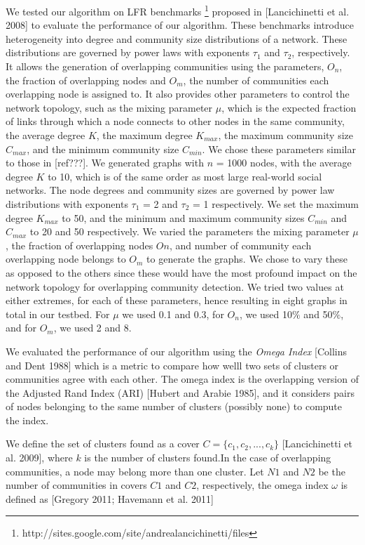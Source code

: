 We tested our algorithm on LFR benchmarks \footnote{http://sites.google.com/site/andrealancichinetti/files} proposed in [Lancichinetti et al. 2008] to evaluate the performance of our algorithm. These benchmarks introduce heterogeneity into degree and community size distributions of a network. These distributions are governed by power laws with exponents $\tau_1$ and $\tau_2$, respectively. It allows the generation of overlapping communities using the parameters, $O_n$, the fraction of overlapping nodes and $O_m$, the number of communities each overlapping node is assigned to. It also provides other parameters to control the network topology, such as the mixing parameter $\mu$, which is the expected fraction of links through which a node connects to other nodes in the same community, the average degree $K$, the maximum degree $K_{max}$, the maximum community size $C_{max}$, and the minimum community size $C_{min}$. We chose these parameters similar to those in [ref???]. We generated graphs with $n$ = 1000 nodes, with the average degree $K$ to 10, which is of the same order as most large real-world social networks. The node degrees and community sizes are governed by power law distributions with exponents $\tau_1$ = 2 and $\tau_2$ = 1 respectively. We set the maximum degree $K_{max}$ to 50, and the minimum and maximum community sizes $C_{min}$ and $C_{max}$ to 20 and 50 respectively. We varied the parameters the mixing parameter $\mu$, the fraction of overlapping nodes $On$, and number of community each overlapping node belongs to $O_m$ to generate the graphs. We chose to vary these as opposed to the others since these would have the most profound impact on the network topology for overlapping community detection. We tried two values at either extremes, for each of these parameters, hence resulting in eight graphs in total in our testbed. For $\mu$ we used 0.1 and 0.3, for $O_n$, we used 10$\%$ and 50$\%$, and for $O_m$, we used 2 and 8.

We evaluated the performance of our algorithm using the {\it Omega Index} [Collins and Dent 1988] which is a metric to compare how welll two sets of clusters or communities agree with each other. The omega index is the overlapping version of the Adjusted Rand Index (ARI) [Hubert and Arabie 1985], and it considers pairs of nodes belonging to the same number of clusters (possibly none) to compute the index.

We define the set of clusters found as a cover $C=\{c_1, c_2, ..., c_k\}$ [Lancichinetti et al. 2009], where $k$ is the number of clusters found.In the case of overlapping communities, a node may belong more than one cluster. Let $N1$ and $N2$ be the number of communities in covers $C1$ and $C2$, respectively, the omega index $\omega$ is defined as [Gregory 2011; Havemann et al. 2011]

